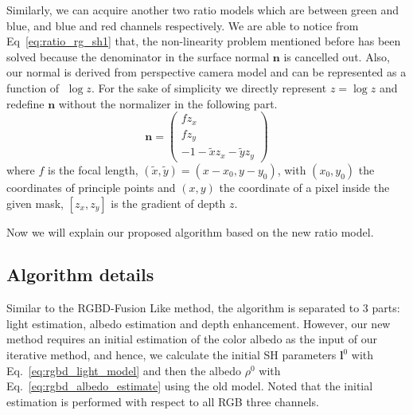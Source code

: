 Similarly, we can acquire another two ratio models which are between green and blue, and blue and red channels respectively.
We are able to notice from Eq~\ref{eq:ratio_rg_sh1} that, the non-linearity problem mentioned before has been solved because the denominator in the surface normal $\mathbf{n}$ is cancelled out.
Also, our normal is derived from perspective camera model and can be represented as a function of $\; \log z$. 
For the sake of simplicity we directly represent $z = \log z$ and redefine $\mathbf{n}$ without the normalizer in the following part.
\begin{equation}\label{eq:ratio_normal}
    \mathbf{n} =
     \begin{pmatrix}
         fz_x\\
         fz_y\\
         -1 - \tilde{x}z_x - \tilde{y}z_y
     \end{pmatrix}
\end{equation}
where $f$ is the focal length, $(\tilde{x}, \tilde{y}) = (x- x_0, y - y_0)$, with $(x_0, y_0)$ the coordinates of principle points and $(x,y)$ the coordinate of a pixel inside the given mask, $[z_x, z_y]$ is the gradient of depth $z$.

Now we will explain our proposed algorithm based on the new ratio model.


\subsection{Algorithm details}
Similar to the RGBD-Fusion Like method, the algorithm is separated to 3 parts: light estimation, albedo estimation and depth enhancement.
However, our new method requires an initial estimation of the color albedo as the input of our iterative method, and hence, we calculate the initial SH parameters $\mathbf{l}^{0}$ with Eq.~\ref{eq:rgbd_light_model} and then the albedo $\rho^{0}$ with Eq.~\ref{eq:rgbd_albedo_estimate} using the old model.
Noted that the initial estimation is performed with respect to all RGB three channels.

